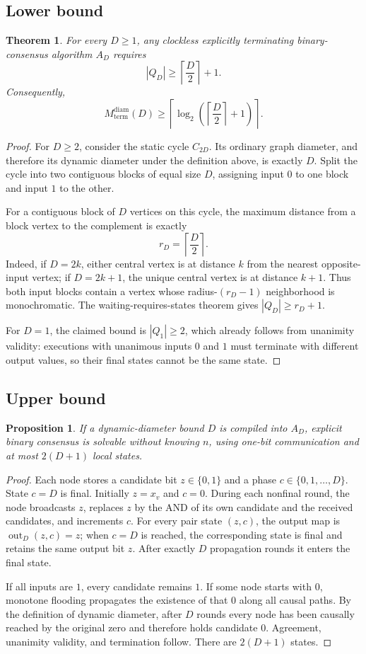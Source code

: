 \documentclass[11pt]{article}
\newtheorem{theorem}{Theorem}
\newtheorem{proposition}{Proposition}
\theoremstyle{remark}
\begin{document}
\subsection{Lower bound}
\begin{theorem}
For every $D\ge1$, any clockless explicitly terminating binary-consensus algorithm $A_D$ requires
\[
|Q_D|\ge \left\lceil\frac D2\right\rceil+1.
\]
Consequently,
\[
M_{\mathrm{term}}^{\mathrm{diam}}(D)
\ge
\left\lceil\log_2\left(\left\lceil\frac D2\right\rceil+1\right)\right\rceil.
\]
\end{theorem}
\begin{proof}
For $D\ge2$, consider the static cycle $C_{2D}$. Its ordinary graph diameter, and therefore its dynamic diameter under the definition above, is exactly $D$. Split the cycle into two contiguous blocks of equal size $D$, assigning input $0$ to one block and input $1$ to the other.

For a contiguous block of $D$ vertices on this cycle, the maximum distance from a block vertex to the complement is exactly
\[
r_D=\left\lceil\frac D2\right\rceil.
\]
Indeed, if $D=2k$, either central vertex is at distance $k$ from the nearest opposite-input vertex; if $D=2k+1$, the unique central vertex is at distance $k+1$. Thus both input blocks contain a vertex whose radius-$(r_D-1)$ neighborhood is monochromatic. The waiting-requires-states theorem gives $|Q_D|\ge r_D+1$.

For $D=1$, the claimed bound is $|Q_1|\ge2$, which already follows from unanimity validity: executions with unanimous inputs $0$ and $1$ must terminate with different output values, so their final states cannot be the same state.
\end{proof}

\subsection{Upper bound}
\begin{proposition}
If a dynamic-diameter bound $D$ is compiled into $A_D$, explicit binary consensus is solvable without knowing $n$, using one-bit communication and at most $2(D+1)$ local states.
\end{proposition}
\begin{proof}
Each node stores a candidate bit $z\in\{0,1\}$ and a phase $c\in\{0,1,\ldots,D\}$. State $c=D$ is final. Initially $z=x_v$ and $c=0$. During each nonfinal round, the node broadcasts $z$, replaces $z$ by the AND of its own candidate and the received candidates, and increments $c$. For every pair state $(z,c)$, the output map is $\operatorname{out}_D(z,c)=z$; when $c=D$ is reached, the corresponding state is final and retains the same output bit $z$. After exactly $D$ propagation rounds it enters the final state.

If all inputs are $1$, every candidate remains $1$. If some node starts with $0$, monotone flooding propagates the existence of that $0$ along all causal paths. By the definition of dynamic diameter, after $D$ rounds every node has been causally reached by the original zero and therefore holds candidate $0$. Agreement, unanimity validity, and termination follow. There are $2(D+1)$ states.
\end{proof}
\end{document}
